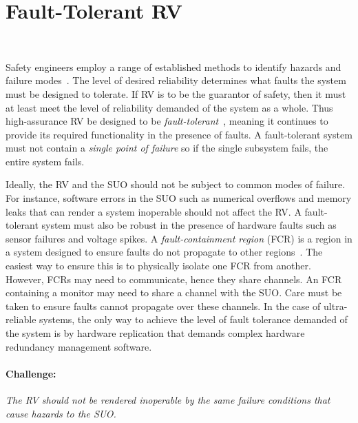 \section{Fault-Tolerant RV}~\label{sec:ft}

 
Safety engineers employ a range of established methods to identify
hazards and failure modes~\cite{Levenson}.  The level of desired
reliability determines what faults the system must be designed to
tolerate. If RV is to be the guarantor of safety, then it must at
least meet the level of reliability demanded of the system as a whole.
Thus high-assurance RV be designed to be
\emph{fault-tolerant}~\cite{butler-faults}, meaning it continues
to provide its required functionality in the presence of faults.  A
fault-tolerant system must not contain a \emph{single point of
  failure} so  if the single subsystem fails, the entire system
fails.

 Ideally, the RV and the SUO should not be subject to common
 modes of failure.  For instance, software errors in the SUO such as
 numerical overflows and memory leaks that can render a system
 inoperable should not affect the RV.  A fault-tolerant system must
 also be robust in the presence of hardware faults such as sensor failures
 and voltage spikes.  A \emph{fault-containment region} (FCR)
 is a region in a system designed to ensure faults do not propagate to
 other regions~\cite{Rushby01:buscompare}.   The 
 easiest way to ensure this is to physically isolate one FCR from
 another.  However, FCRs may need to communicate, hence they share
 channels. An FCR containing a monitor may need to share a channel
 with the SUO.  Care must be taken to ensure faults cannot propagate
 over these channels. In the case of ultra-reliable systems, the only
 way to achieve the level of fault tolerance demanded of the system is
 by hardware replication that demands complex hardware redundancy
 management software. 


\paragraph{Challenge:}   \emph{The RV  should not be rendered inoperable by the
 same failure conditions that cause hazards to the SUO.}


